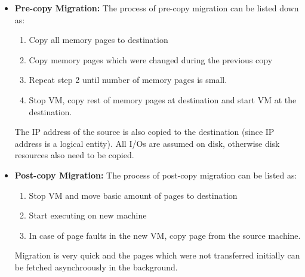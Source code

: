 \documentclass[twoside]{article}
\begin{document}
\begin{itemize}
    \item \textbf{Pre-copy Migration:} The process of pre-copy migration can be listed down as:
    \begin{enumerate}
        \item Copy all memory pages to destination
        \item Copy memory pages which were changed during the previous copy
        \item Repeat step 2 until number of memory pages is small.
        \item Stop VM, copy rest of memory pages at destination and start VM at the destination.
    \end{enumerate}
    The IP address of the source is also copied to the destination (since IP address is a logical entity). All I/Os are assumed on disk, otherwise disk resources also need to be copied. 
    \item \textbf{Post-copy Migration:} The process of post-copy migration can be listed as:
    \begin{enumerate}
        \item Stop VM and move basic amount of pages to destination
        \item Start executing on new machine
        \item In case of page faults in the new VM, copy page from the source machine.
    \end{enumerate}
    Migration is very quick and the pages which were not transferred initially can be fetched asynchroously in the background.
\end{itemize}
\end{document}
